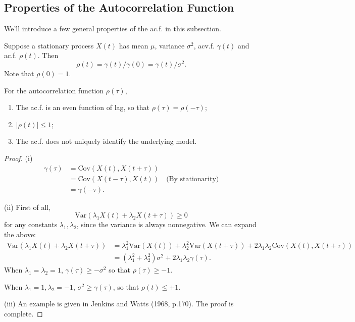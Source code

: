 \subsection{Properties of the Autocorrelation Function}
We'll introduce a few general properties of the ac.f. in this subsection.

Suppose a stationary process $X(t)$ has mean $\mu$, variance $\sigma^2$, acv.f. $\gamma(t)$ and ac.f. $\rho(t)$. 
Then 
\[ \rho(t) = \gamma(t) / \gamma(0) = \gamma(t) / \sigma^2. \]
Note that $\rho(0) = 1$.

\begin{proposition*}
For the autocorrelation function $\rho(\tau)$, 
\begin{enumerate}
	\item The ac.f. is an even function of lag, so that $\rho(\tau) = \rho(-\tau)$;
	\item $|\rho(t)| \leq 1$;
	\item The ac.f. does not uniquely identify the underlying model.
\end{enumerate}
\end{proposition*}

\begin{proof}
(i) 
\begin{align*}
	\gamma(\tau) 
	&= \mathrm{Cov}(X(t), X(t + \tau)) \\
	&= \mathrm{Cov}(X(t - \tau), X(t)) \quad \text{(By stationarity)} \\
	&= \gamma(-\tau).
\end{align*}

(ii) First of all, 
\[ \mathrm{Var}(\lambda_1 X(t) + \lambda_2 X(t + \tau)) \geq 0 \]
for any constants $\lambda_1, \lambda_2$, since the variance is always nonnegative. We can expand the above:
\begin{align*}
	\mathrm{Var}(\lambda_1 X(t) + \lambda_2 X(t + \tau))
	&= \lambda_1^2 \mathrm{Var}(X(t)) + \lambda_2^2 \mathrm{Var}(X(t + \tau)) 
	+ 2 \lambda_1 \lambda_2 \mathrm{Cov}(X(t), X(t + \tau)) \\
	&= (\lambda_1^2 + \lambda_2^2)\sigma^2 + 2 \lambda_1 \lambda_2 \gamma(\tau).
\end{align*}
When $\lambda_1 = \lambda_2 = 1$, $\gamma(\tau) \geq -\sigma^2$ so that $\rho(\tau) \geq -1$.

When $\lambda_1 = 1, \lambda_2 = -1$, $\sigma^2 \geq \gamma(\tau)$, so that $\rho(t) \leq +1$.

(iii) An example is given in Jenkins and Watts (1968, p.170). The proof is complete.

\end{proof}

